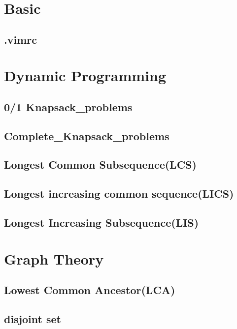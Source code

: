 \section{Basic}
    \subsection{.vimrc}
        

\section{Dynamic Programming}
    \subsection{0/1 Knapsack\_problems}
        
    \subsection{Complete\_Knapsack\_problems}
        
    \subsection{Longest Common Subsequence(LCS)}
        
    \subsection{Longest increasing common sequence(LICS)}
        
    \subsection{Longest Increasing Subsequence(LIS)}
        
\section{Graph Theory}
    \subsection{Lowest Common Ancestor(LCA)}
        
    \subsection{disjoint set}
        
